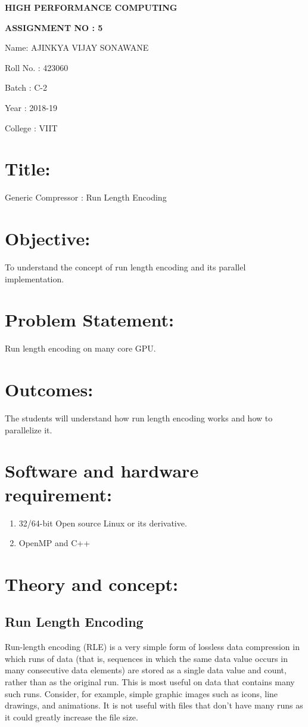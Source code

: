 \documentclass[15pt,a4paper]{article}
\begin{document}
	\begin{center}
		\LARGE \textbf {HIGH PERFORMANCE COMPUTING}
	\end{center}
		\begin{center}
			\textbf {ASSIGNMENT NO : 5}
	
	
	Name: AJINKYA VIJAY SONAWANE
	
	Roll No. : 423060
	
	Batch : C-2
	
	Year : 2018-19
	
	College : VIIT
	

		\end{center}
	\section{Title:}
		Generic Compressor : Run Length Encoding
\section{Objective:}
	To understand the concept of run length encoding and its parallel implementation.	
	\section{Problem Statement:}
	\par Run length encoding on many core GPU.

	
	
	\section{Outcomes:}The students will understand how run length encoding works and how to parallelize it.
	\section{Software and hardware requirement:}
	\begin{enumerate}
		
		\item 32/64-bit Open source Linux or its derivative.
		\item OpenMP and C++
	 	\end{enumerate}
	\section{Theory and concept:}
	
	\subsection{Run Length Encoding}
	Run-length encoding (RLE) is a very simple form of lossless data compression in which runs of data (that is, sequences in which the same data value occurs in many consecutive data elements) are stored as a single data value and count, rather than as the original run. This is most useful on data that contains many such runs. Consider, for example, simple graphic images such as icons, line drawings, and animations. It is not useful with files that don't have many runs as it could greatly increase the file size.
	
\end{document}
